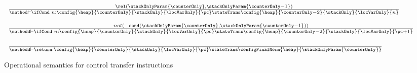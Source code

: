\begin{figure}[ht!] 
\begin{frameit}
 $$ \begin{array}{l}
           {\scriptsize \frac{ \rel ( \stackOnlyParam{\counterOnly}, \stackOnlyParam{\counterOnly - 1}) } 			       		               
                      {\method \vdash \ifCond \ n : \config{\heap }{\counterOnly}{\stackOnly}{\locVarOnly}{\pc}
		                      \stateTrans 
				      \config{\heap}{\counterOnly - 2}{\stackOnly}{\locVarOnly}{n}} 
            } \\    \\
		 {\scriptsize
                 \frac{  not (\mbox{ \rm \texttt{ cond}}( \stackOnlyParam{\counterOnly}, \stackOnlyParam{\counterOnly - 1})) }		                             
                     {\methodd \vdash \ifCond \ n : \config{\heap}{\counterOnly}{\stackOnly}{\locVarOnly}{\pc} 
		                    \stateTrans 
                                    \config{\heap}{\counterOnly - 2}{\stackOnly}{\locVarOnly}{\pc + 1}} } \\ \\
           {\scriptsize \frac{ } 
            {\methodd \vdash \return :\config{\heap}{\counterOnly}{\stackOnly}{\locVarOnly}{\pc} 
		                    \stateTrans 
                                    \configFinalNorm{\heap}{\stackOnlyParam{\counterOnly}}}   }
\end{array}
$$

\caption{\sc Operational semantics for control transfer instructions}
\label{opSem:jump}
\end{frameit}
\end{figure}



